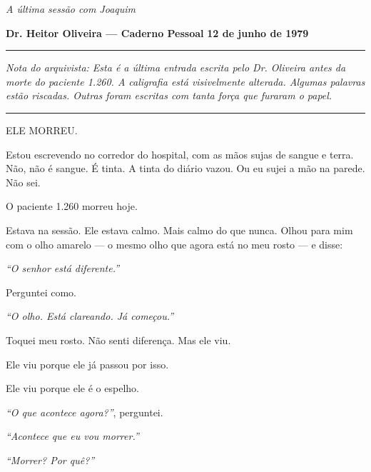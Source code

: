 
\noindent \textit{A última sessão com Joaquim}

\noindent \textbf{Dr. Heitor Oliveira --- Caderno Pessoal}
\textbf{12 de junho de 1979}

\vspace{0.5em}\noindent\rule{\textwidth}{0.5pt}\vspace{0.5em}

\noindent \textit{Nota do arquivista: Esta é a última entrada escrita pelo Dr. Oliveira antes da morte do paciente 1.260. A caligrafia está visivelmente alterada. Algumas palavras estão riscadas. Outras foram escritas com tanta força que furaram o papel.}

\vspace{0.5em}\noindent\rule{\textwidth}{0.5pt}\vspace{0.5em}

\noindent ELE MORREU.

\noindent Estou escrevendo no corredor do hospital, com as mãos sujas de sangue e terra. Não, não é sangue. É tinta. A tinta do diário vazou. Ou eu sujei a mão na parede. Não sei.

\noindent O paciente 1.260 morreu hoje.

\noindent Estava na sessão. Ele estava calmo. Mais calmo do que nunca. Olhou para mim com o olho amarelo --- o mesmo olho que agora está no meu rosto --- e disse:

\noindent \textit{\textquotedblleft{}O senhor está diferente.\textquotedblright{}}

\noindent Perguntei como.

\noindent \textit{\textquotedblleft{}O olho. Está clareando. Já começou.\textquotedblright{}}

\noindent Toquei meu rosto. Não senti diferença. Mas ele viu.

\noindent Ele viu porque ele já passou por isso.

\noindent Ele viu porque ele é o espelho.

\noindent \textit{\textquotedblleft{}O que acontece agora?\textquotedblright{}}, perguntei.

\noindent \textit{\textquotedblleft{}Acontece que eu vou morrer.\textquotedblright{}}

\noindent \textit{\textquotedblleft{}Morrer? Por quê?\textquotedblright{}}

